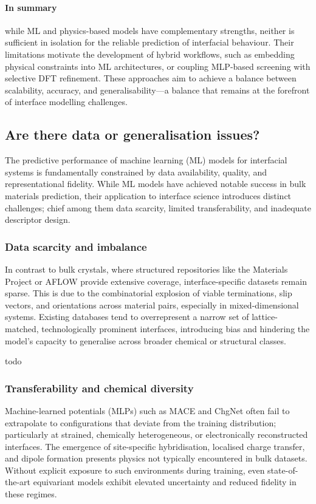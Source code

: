 \paragraph{In summary} while ML and physics-based models have complementary strengths, neither is sufficient in
isolation for the reliable prediction of interfacial behaviour. Their limitations motivate the development of hybrid
workflows, such as embedding physical constraints into ML architectures, or coupling MLP-based screening with selective
DFT refinement. These approaches aim to achieve a balance between scalability, accuracy, and generalisability---a
balance that remains at the forefront of interface modelling challenges.

\subsection{Are there data or generalisation issues?}

The predictive performance of machine learning (ML) models for interfacial systems is fundamentally constrained by data
availability, quality, and representational fidelity. While ML models have achieved notable success in bulk materials
prediction, their application to interface science introduces distinct challenges; chief among them data scarcity,
limited transferability, and inadequate descriptor design.

\subsubsection{Data scarcity and imbalance}

In contrast to bulk crystals, where structured repositories like the Materials Project or AFLOW provide extensive
coverage, interface-specific datasets remain sparse. This is due to the combinatorial explosion of viable terminations,
slip vectors, and orientations across material pairs, especially in mixed-dimensional systems. Existing databases tend
to overrepresent a narrow set of lattice-matched, technologically prominent interfaces, introducing bias and hindering
the model's capacity to generalise across broader chemical or structural classes.

todo

\subsubsection{Transferability and chemical diversity}

Machine-learned potentials (MLPs) such as MACE and ChgNet often fail to extrapolate to configurations that deviate from
the training distribution; particularly at strained, chemically heterogeneous, or electronically reconstructed
interfaces. The emergence of site-specific hybridisation, localised charge transfer, and dipole formation presents
physics not typically encountered in bulk datasets. Without explicit exposure to such environments during training,
even state-of-the-art equivariant models exhibit elevated uncertainty and reduced fidelity in these regimes.

